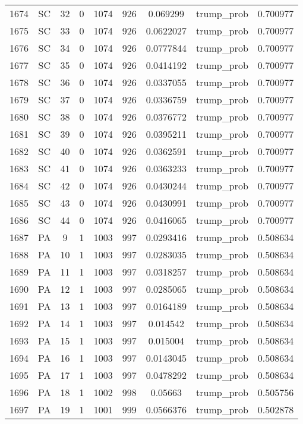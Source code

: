 \documentclass[12pt,a4paper]{article}
\begin{document}
\begin{tabular}{r|cccccccc}
	1674 & SC & 32 & 0 & 1074 & 926 & 0.069299 & trump\_prob & 0.700977 \\
	1675 & SC & 33 & 0 & 1074 & 926 & 0.0622027 & trump\_prob & 0.700977 \\
	1676 & SC & 34 & 0 & 1074 & 926 & 0.0777844 & trump\_prob & 0.700977 \\
	1677 & SC & 35 & 0 & 1074 & 926 & 0.0414192 & trump\_prob & 0.700977 \\
	1678 & SC & 36 & 0 & 1074 & 926 & 0.0337055 & trump\_prob & 0.700977 \\
	1679 & SC & 37 & 0 & 1074 & 926 & 0.0336759 & trump\_prob & 0.700977 \\
	1680 & SC & 38 & 0 & 1074 & 926 & 0.0376772 & trump\_prob & 0.700977 \\
	1681 & SC & 39 & 0 & 1074 & 926 & 0.0395211 & trump\_prob & 0.700977 \\
	1682 & SC & 40 & 0 & 1074 & 926 & 0.0362591 & trump\_prob & 0.700977 \\
	1683 & SC & 41 & 0 & 1074 & 926 & 0.0363233 & trump\_prob & 0.700977 \\
	1684 & SC & 42 & 0 & 1074 & 926 & 0.0430244 & trump\_prob & 0.700977 \\
	1685 & SC & 43 & 0 & 1074 & 926 & 0.0430991 & trump\_prob & 0.700977 \\
	1686 & SC & 44 & 0 & 1074 & 926 & 0.0416065 & trump\_prob & 0.700977 \\
	1687 & PA & 9 & 1 & 1003 & 997 & 0.0293416 & trump\_prob & 0.508634 \\
	1688 & PA & 10 & 1 & 1003 & 997 & 0.0283035 & trump\_prob & 0.508634 \\
	1689 & PA & 11 & 1 & 1003 & 997 & 0.0318257 & trump\_prob & 0.508634 \\
	1690 & PA & 12 & 1 & 1003 & 997 & 0.0285065 & trump\_prob & 0.508634 \\
	1691 & PA & 13 & 1 & 1003 & 997 & 0.0164189 & trump\_prob & 0.508634 \\
	1692 & PA & 14 & 1 & 1003 & 997 & 0.014542 & trump\_prob & 0.508634 \\
	1693 & PA & 15 & 1 & 1003 & 997 & 0.015004 & trump\_prob & 0.508634 \\
	1694 & PA & 16 & 1 & 1003 & 997 & 0.0143045 & trump\_prob & 0.508634 \\
	1695 & PA & 17 & 1 & 1003 & 997 & 0.0478292 & trump\_prob & 0.508634 \\
	1696 & PA & 18 & 1 & 1002 & 998 & 0.05663 & trump\_prob & 0.505756 \\
	1697 & PA & 19 & 1 & 1001 & 999 & 0.0566376 & trump\_prob & 0.502878 \\

\end{tabular}
\end{document}

